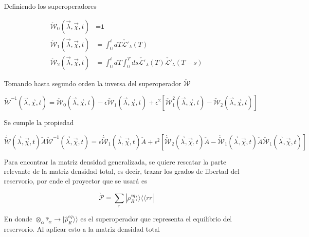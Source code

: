 \begin{appendixs}
Definiendo los superoperadores

\begin{align*}
    \check{\mathcal{W}}_{0}(\vec{\lambda},\vec{\chi},t) &  = \textbf{1}\\
    \check{\mathcal{W}}_{1}(\vec{\lambda},\vec{\chi},t) & = \int_{0}^{t}dT \check{\mathcal{L}'}_{\lambda}(T) \\
    \check{\mathcal{W}}_{2}(\vec{\lambda},\vec{\chi},t) & = \int_{0}^{t}dT \int_{0}^{T}ds \check{\mathcal{L}'}_{\lambda}(T)\check{\mathcal{L}'}_{\lambda}(T-s)
\end{align*}

Tomando hasta segundo orden la inversa del superoperador $\check{\mathcal{W}}$

\begin{equation}
    \check{\mathcal{W}}^{-1}(\vec{\lambda},\vec{\chi},t) =  \check{\mathcal{W}}_{0}(\vec{\lambda},\vec{\chi},t) - \epsilon  \check{\mathcal{W}}_{1}(\vec{\lambda},\vec{\chi},t) +  \epsilon^{2}[\check{\mathcal{W}}^{2}_{1}(\vec{\lambda},\vec{\chi},t) -  \check{\mathcal{W}}_{2}(\vec{\lambda},\vec{\chi},t) ]
\label{apendix2inverseW}
\end{equation}

Se cumple la propiedad

\begin{equation}
    \dot{\check{\mathcal{W}}}(\vec{\lambda},\vec{\chi},t)\check{A}\check{\mathcal{W}}^{-1}(\vec{\lambda},\vec{\chi},t) = \epsilon \dot{\check{\mathcal{W}}}_{1}(\vec{\lambda},\vec{\chi},t)\check{A} + \epsilon^{2}[\dot{\check{\mathcal{W}}}_{2}(\vec{\lambda},\vec{\chi},t)\check{A} - \dot{\check{\mathcal{W}}}_{1}(\vec{\lambda},\vec{\chi},t)\check{A}\check{\mathcal{W}}_{1}(\vec{\lambda},\vec{\chi},t) ]
    \label{apendix2Wproperty}
\end{equation}

Para encontrar la matriz densidad generalizada, se quiere rescatar la parte relevante de la matriz densidad total, es decir, trazar los grados de libertad del reservorio, por ende el proyector que se usará es 

\begin{equation*}
    \check{\mathcal{P}} = \sum_{r}|\rho_{R}^{eq} \rangle \rangle \langle \langle rr|
\end{equation*}

En donde $\otimes_{\alpha} \hat{\tau}_{\alpha} \to  |\hat{\rho}_{R}^{eq} \rangle \rangle$ es el superoperador que representa el equilibrio del reservorio. Al aplicar esto a la matriz densidad total


\end{appendixs}
